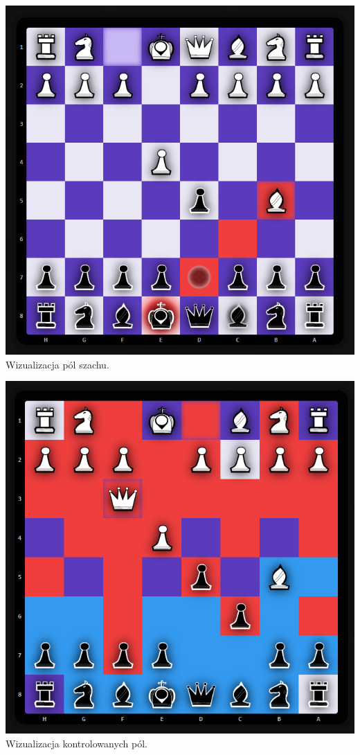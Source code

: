\documentclass[12pt,a4paper]{article}
\begin{document}
\vspace{1cm}
\begin{minipage}[t]{0.45\textwidth} 
    \vspace{0pt} 
    \centering 
    \includegraphics[width=\linewidth]{images/imp_front_check_areas.png} 
    Wizualizacja pól szachu.
\end{minipage} 
\hfill 
\begin{minipage}[t]{0.45\textwidth} 
    \vspace{0pt} 
    \centering 
    \includegraphics[width=\linewidth]{images/imp_front_controlled_areas.png} 
    Wizualizacja kontrolowanych pól.
\end{minipage}
\end{document}
